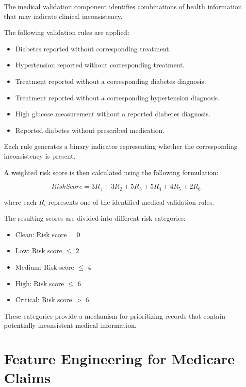 The medical validation component identifies combinations of health information that may indicate clinical inconsistency.

The following validation rules are applied:

\begin{itemize}

\item Diabetes reported without corresponding treatment.

\item Hypertension reported without corresponding treatment.

\item Treatment reported without a corresponding diabetes diagnosis.

\item Treatment reported without a corresponding hypertension diagnosis.

\item High glucose measurement without a reported diabetes diagnosis.

\item Reported diabetes without prescribed medication.

\end{itemize}

Each rule generates a binary indicator representing whether the corresponding inconsistency is present.

A weighted risk score is then calculated using the following formulation:

\[
RiskScore =
3R_1 + 3R_2 + 5R_3 + 5R_4 + 4R_5 + 2R_6
\]

where each $R_i$ represents one of the identified medical validation rules.

The resulting scores are divided into different risk categories:

\begin{itemize}
\item Clean: Risk score = 0
\item Low: Risk score $\leq$ 2
\item Medium: Risk score $\leq$ 4
\item High: Risk score $\leq$ 6
\item Critical: Risk score $>$ 6
\end{itemize}

These categories provide a mechanism for prioritizing records that contain potentially inconsistent medical information.

\section{Feature Engineering for Medicare Claims}

